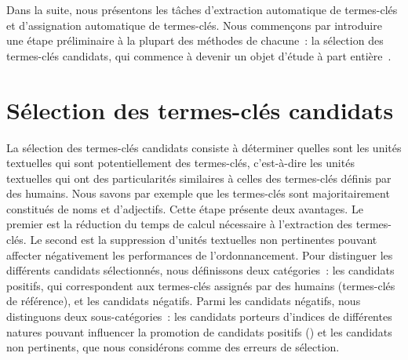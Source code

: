     Dans la suite, nous présentons les tâches d'extraction automatique de
    termes-clés et d'assignation automatique de termes-clés. Nous commençons par
    introduire une étape préliminaire à la plupart des méthodes de chacune~: la
    sélection des termes-clés candidats, qui commence à devenir un objet d'étude
    à part entière~\cite{wang2014keyphraseextractionpreprocessing}.


  \section{Sélection des termes-clés candidats}
  \label{sec:main-state_of_the_art-keyphrase_candidate_selection}
    La sélection des termes-clés candidats consiste à déterminer quelles sont
    les unités textuelles qui sont potentiellement des termes-clés, c'est-à-dire
    les unités textuelles qui ont des particularités similaires à celles des
    termes-clés définis par des humains. Nous savons par exemple que les
    termes-clés sont majoritairement constitués de noms et d'adjectifs. Cette
    étape présente deux avantages. Le premier est la réduction du temps de
    calcul nécessaire à l'extraction des  termes-clés. Le second est la
    suppression d'unités textuelles non pertinentes pouvant affecter
    négativement les performances de l'ordonnancement. Pour distinguer les
    différents candidats sélectionnés, nous définissons deux catégories~: les
    candidats positifs, qui correspondent aux termes-clés assignés par des
    humains (termes-clés de référence), et les candidats négatifs. Parmi les
    candidats négatifs, nous distinguons deux sous-catégories~: les candidats
    porteurs d'indices de différentes natures pouvant
    influencer la promotion de candidats positifs () et les
    candidats non pertinents, que nous considérons comme des
    erreurs de sélection.

